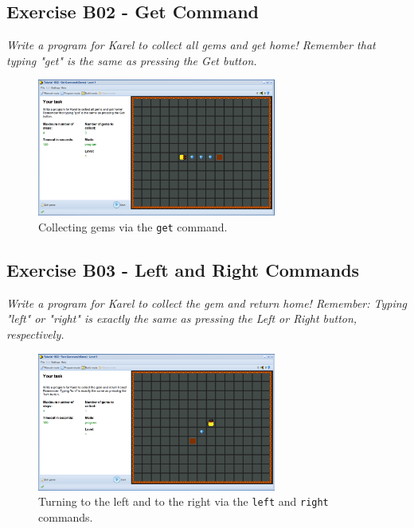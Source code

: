 \documentclass[article,A4,12pt]{llncs}
\begin{document}
\subsection{Exercise B02 - Get Command}

{\em Write a program for Karel to collect all gems and get home! 
Remember that typing "get" is the same as pressing the Get button.}\\[-7mm]

\begin{figure}[!ht]
\begin{center}
\includegraphics[width=0.7\textwidth]{img/b02.png}
\end{center}
\vspace{-4mm}
\caption{Collecting gems via the {\tt get} command.}
\label{fig:b02}
\vspace{-4mm}
\end{figure}
\noindent

\newpage

\subsection{Exercise B03 - Left and Right Commands}

{\em Write a program for Karel to collect the gem and return 
home! Remember: Typing "left" or "right" is exactly the same as pressing 
the Left or Right button, respectively.}\\[-7mm]

\begin{figure}[!ht]
\begin{center}
\includegraphics[width=0.7\textwidth]{img/b03.png}
\end{center}
\vspace{-4mm}
\caption{Turning to the left and to the right via the {\tt left} and {\tt right} commands.}
\label{fig:b03}
\vspace{-4mm}
\end{figure}
\noindent
\end{document}
